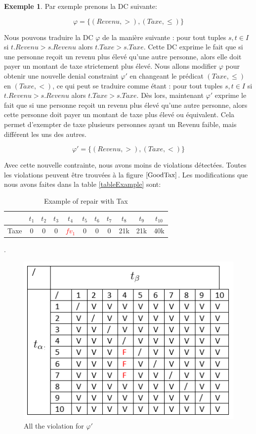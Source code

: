 \documentclass[letterpaper, 12pt]{report}
\theoremstyle{definition}
\newtheorem{myexample}{Exemple}
\begin{document}
\begin{myexample}
Par exemple prenons la DC suivante:

$$ \varphi = \{(Revenu,>),(Taxe,\leq) \} $$

Nous pouvons traduire la DC $\varphi$ de la manière suivante : pour tout tuples $s,t \in I$ si $t.Revenu>s.Revenu$ alors $t.Taxe > s.Taxe$. Cette DC exprime le fait que si une personne reçoit un revenu plus élevé qu'une autre personne, alors elle doit payer un montant de taxe strictement plus élevé. Nous allons modifier $\varphi$ pour obtenir une nouvelle denial constraint $\varphi'$ en changeant le prédicat $(Taxe,\leq)$ en $(Taxe,<)$, ce qui peut se traduire comme étant : pour tout tuples $s,t \in I$ si $t.Revenu>s.Revenu$ alors $t.Taxe > s.Taxe$. Dès lors, maintenant $\varphi'$ exprime le fait que si une personne reçoit un revenu plus élevé qu'une autre personne, alors cette personne doit payer un montant de taxe plus élevé ou équivalent. Cela permet d'exempter de taxe plusieurs personnes ayant un Revenu faible, mais différent les uns des autres. 

$$ \varphi' = \{(Revenu,>),(Taxe,<) \} $$

Avec cette nouvelle contrainte, nous avons moins de violations détectées. Toutes les violations peuvent être trouvées à la figure $\ref{GoodTax}$. Les modifications que nous avons faites dans la table \ref{tableExample} sont:

\begin{table}[H]
	\centering
	\begin{tabular}{|c|c c c c c c c c c c|}
	\hline
	   & $t_1$ & $t_2$ & $t_3$ &$t_4$ &$t_5$ &$t_6$ &$t_7$ &$t_8$ &$t_9$ &$t_{10}$ \\
	\hline
	 Taxe & 0 & 0 & 0 & \textcolor{red}{$fv_1$} & 0 & 0 & 0 & 21k & 21k & 40k\\
	 \hline
	\end{tabular}
	\caption{\label{tableExample2} Example of repair with Tax}.
\end{table}


\begin{figure}
	\centering
	\includegraphics[scale=1]{img/TaxGood}
	\caption{\label{GoodTax} All the violation for $\varphi '$}
\end{figure}


\end{myexample}
\end{document}
